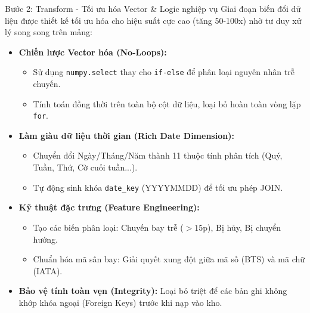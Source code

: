 \begin{frame}{Bước 2: Transform - Tối ưu hóa Vector \& Logic nghiệp vụ}
  Giai đoạn biến đổi dữ liệu được thiết kế tối ưu hóa cho hiệu suất cực cao (tăng 50-100x) nhờ tư duy xử lý song song trên mảng:
  
  \begin{itemize}
      \item \textbf{Chiến lược Vector hóa (No-Loops):}
          \begin{itemize}
              \item Sử dụng \texttt{numpy.select} thay cho \texttt{if-else} để phân loại nguyên nhân trễ chuyến.
              \item Tính toán đồng thời trên toàn bộ cột dữ liệu, loại bỏ hoàn toàn vòng lặp \texttt{for}.
          \end{itemize}
      \item \textbf{Làm giàu dữ liệu thời gian (Rich Date Dimension):}
          \begin{itemize}
              \item Chuyển đổi Ngày/Tháng/Năm thành 11 thuộc tính phân tích (Quý, Tuần, Thứ, Cờ cuối tuần...).
              \item Tự động sinh khóa \texttt{date\_key} (YYYYMMDD) để tối ưu phép JOIN.
          \end{itemize}
      \item \textbf{Kỹ thuật đặc trưng (Feature Engineering):}
          \begin{itemize}
              \item Tạo các biến phân loại: Chuyến bay trễ ($>15$p), Bị hủy, Bị chuyển hướng.
              \item Chuẩn hóa mã sân bay: Giải quyết xung đột giữa mã số (BTS) và mã chữ (IATA).
          \end{itemize}
      \item \textbf{Bảo vệ tính toàn vẹn (Integrity):} Loại bỏ triệt để các bản ghi không khớp khóa ngoại (Foreign Keys) trước khi nạp vào kho.
  \end{itemize}
  \end{frame}

